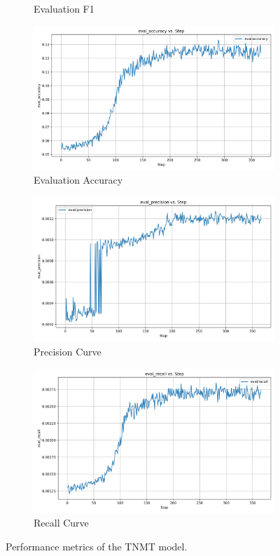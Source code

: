 \documentclass[12pt]{article}
\begin{document}
\begin{figure}[H]
\begin{subfigure}[b]{0.32\textwidth}
		\caption{Evaluation F1}
		\label{fig:eval_f1}
	\end{subfigure}
	\begin{subfigure}[b]{0.32\textwidth}
		\includegraphics[width=\linewidth]{eval_accuracy.png}
		\caption{Evaluation Accuracy}
		\label{fig:eval_accuracy}
	\end{subfigure}
	\hfill
	\begin{subfigure}[b]{0.32\textwidth}
		\includegraphics[width=\linewidth]{eval_precision.png}
		\caption{Precision Curve}
		\label{fig:eval_precision}
	\end{subfigure}
	\hfill
	\begin{subfigure}[b]{0.32\textwidth}
		\includegraphics[width=\linewidth]{eval_recall.png}
		\caption{Recall Curve}
		\label{fig:eval_recall}
	\end{subfigure}
	\caption{Performance metrics of the TNMT model.}
	\label{fig:tnmt_performance}
\end{figure}
\end{document}
